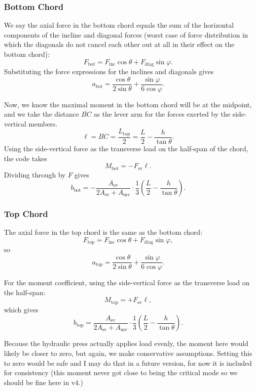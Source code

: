 \documentclass[11pt]{article}
\begin{document}
\subsubsection{Bottom Chord}

We say the axial force in the bottom chord equals the sum of the horizontal components of the incline and diagonal forces (worst case of force distribution in which the diagonals do not cancel each other out at all in their effect on the bottom chord):
\[
F_\text{bot} = F_\text{inc}\cos\theta + F_\text{diag}\sin\varphi.
\]
Substituting the force expressions for the inclines and diagonals gives
\[
\boxed{a_\text{bot}
= \frac{\cos\theta}{2\sin\theta} + \frac{\sin\varphi}{6\cos\varphi}.}
\]

Now, we know the maximal moment in the bottom chord will be at the midpoint, and we take the distance $\overline{BC}$ as the lever arm for the forces exerted by the side-vertical members.
\[
\ell = \overline{BC} = \frac{L_\text{top}}{2} = \frac{L}{2} - \frac{h}{\tan\theta}.
\]
Using the side-vertical force as the transverse load on the half-span of the chord, the
code takes
\[
M_\text{bot} = -F_\text{sv}\ell.
\]
Dividing through by $F$ gives
\[
\boxed{b_\text{bot} = -\frac{A_\text{sv}}{2A_\text{sv} + A_\text{mv}}\cdot\frac{1}{3}
\left(\frac{L}{2} - \frac{h}{\tan\theta}\right).}
\]

\subsubsection{Top Chord}

The axial force in the top chord is the same as the bottom chord:
\[
F_\text{top} = F_\text{inc}\cos\theta + F_\text{diag}\sin\varphi,
\]
so
\[
\boxed{a_\text{top}
= \frac{\cos\theta}{2\sin\theta} + \frac{\sin\varphi}{6\cos\varphi}.}
\]

For the moment coefficient, using the side-vertical force as the transverse load on the half-span:
\[
M_\text{top} = +F_\text{sv}\ell,
\]
which gives
\[
\boxed{b_\text{top} = \frac{A_\text{sv}}{2A_\text{sv} + A_\text{mv}}\cdot\frac{1}{3}
\left(\frac{L}{2} - \frac{h}{\tan\theta}\right).}
\]

Because the hydraulic press actually applies load evenly, the moment here would likely be closer to zero, but again, we make conservative assumptions. Setting this to zero would be safe and I may do that in a future version, for now it is included for consistency (this moment never got close to being the critical mode so we should be fine here in v4.)
\end{document}
